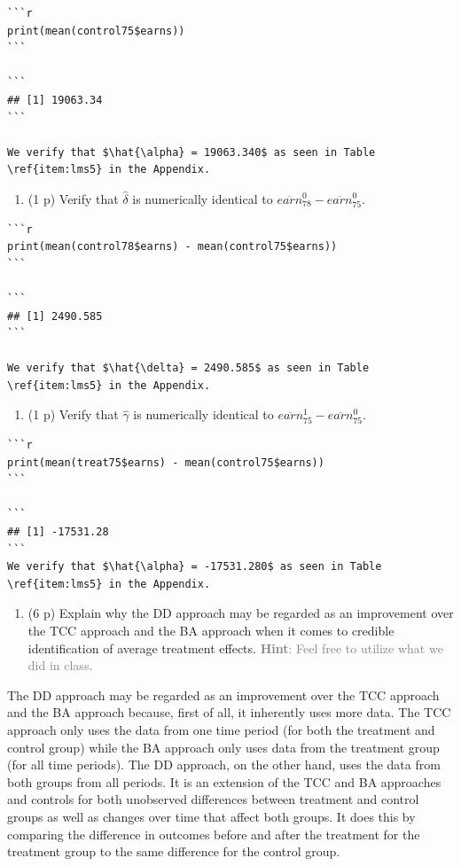 \documentclass[
]{article}
\providecommand{\tightlist}{%
  \setlength{\itemsep}{0pt}\setlength{\parskip}{0pt}}
\begin{document}
\begin{verbatim}
```r
print(mean(control75$earns))
```

```
## [1] 19063.34
```

We verify that $\hat{\alpha} = 19063.340$ as seen in Table \ref{item:lms5} in the Appendix. 
\end{verbatim}

\begin{enumerate}
\def\labelenumi{\alph{enumi}.}
\setcounter{enumi}{2}
\tightlist
\item
  (1 p) Verify that \(\hat{\delta}\) is numerically identical to
  \(\overline{earn}_{78}^{0}-\overline{earn}_{75}^{0}\).
\end{enumerate}

\begin{verbatim}
```r
print(mean(control78$earns) - mean(control75$earns))
```

```
## [1] 2490.585
```

We verify that $\hat{\delta} = 2490.585$ as seen in Table \ref{item:lms5} in the Appendix.
\end{verbatim}

\begin{enumerate}
\def\labelenumi{\alph{enumi}.}
\setcounter{enumi}{3}
\tightlist
\item
  (1 p) Verify that \(\hat{\gamma}\) is numerically identical to
  \(\overline{earn}_{75}^{1}-\overline{earn}_{75}^{0}\).
\end{enumerate}

\begin{verbatim}
```r
print(mean(treat75$earns) - mean(control75$earns))
```

```
## [1] -17531.28
```
We verify that $\hat{\alpha} = -17531.280$ as seen in Table \ref{item:lms5} in the Appendix. 
\end{verbatim}

\begin{enumerate}
\def\labelenumi{\arabic{enumi}.}
\setcounter{enumi}{7}
\tightlist
\item
  (6 p) Explain why the DD approach may be regarded as an improvement
  over the TCC approach and the BA approach when it comes to credible
  identification of average treatment effects.
  \textcolor{gray}{\textbf{Hint}: Feel free to utilize what we did in class.}
\end{enumerate}

The DD approach may be regarded as an improvement over the TCC approach
and the BA approach because, first of all, it inherently uses more data.
The TCC approach only uses the data from one time period (for both the
treatment and control group) while the BA approach only uses data from
the treatment group (for all time periods). The DD approach, on the
other hand, uses the data from both groups from all periods. It is an
extension of the TCC and BA approaches and controls for both unobserved
differences between treatment and control groups as well as changes over
time that affect both groups. It does this by comparing the difference
in outcomes before and after the treatment for the treatment group to
the same difference for the control group.
\end{document}

